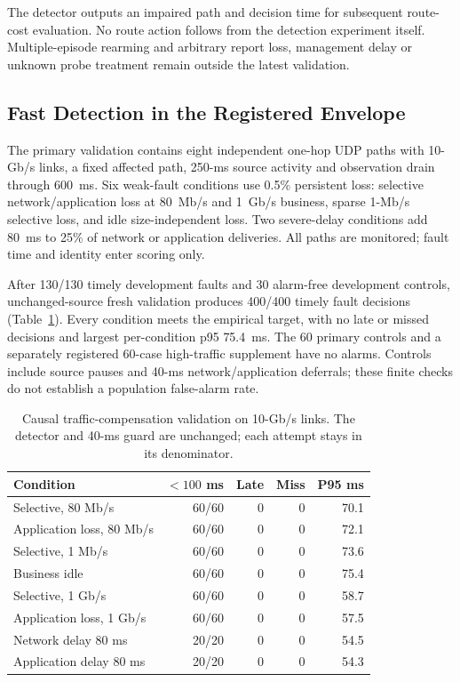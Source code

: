 \documentclass[sigconf]{acmart}
\begin{document}
The detector outputs an impaired path and decision time for subsequent
route-cost evaluation. No route action follows from the detection experiment
itself. Multiple-episode rearming and arbitrary report loss, management delay
or unknown probe treatment remain outside the latest validation.

\subsection{Fast Detection in the Registered Envelope}
\label{app:udp-primary-validation}
The primary validation contains eight independent one-hop UDP paths with
10-Gb/s links, a fixed affected path, 250-ms source activity and observation
drain through 600~ms. Six weak-fault conditions use 0.5\% persistent loss:
selective network/application loss at 80~Mb/s and 1~Gb/s business, sparse
1-Mb/s selective loss, and idle size-independent loss. Two severe-delay
conditions add 80~ms to 25\% of network or application deliveries. All paths
are monitored; fault time and identity enter scoring only.

After 130/130 timely development faults and 30 alarm-free development
controls, unchanged-source fresh validation produces 400/400 timely fault
decisions (Table~\ref{tab:adaptive-business-validation}). Every condition
meets the empirical target, with no late or missed decisions and largest
per-condition p95 75.4~ms. The 60 primary controls and a separately registered
60-case high-traffic supplement have no alarms. Controls include source
pauses and 40-ms network/application deferrals; these finite checks do not
establish a population false-alarm rate.

\begin{table}[t]
\caption{Causal traffic-compensation validation on 10-Gb/s links.
The detector and 40-ms guard are unchanged; each attempt stays in its denominator.}
\label{tab:adaptive-business-validation}
\centering
\small
\setlength{\tabcolsep}{3pt}
\begin{tabular}{@{}lrrrr@{}}
\toprule
Condition & $<100$ ms & Late & Miss & P95 ms \\
\midrule
Selective, 80 Mb/s & 60/60 & 0 & 0 & 70.1 \\
Application loss, 80 Mb/s & 60/60 & 0 & 0 & 72.1 \\
Selective, 1 Mb/s & 60/60 & 0 & 0 & 73.6 \\
Business idle & 60/60 & 0 & 0 & 75.4 \\
Selective, 1 Gb/s & 60/60 & 0 & 0 & 58.7 \\
Application loss, 1 Gb/s & 60/60 & 0 & 0 & 57.5 \\
Network delay 80 ms & 20/20 & 0 & 0 & 54.5 \\
Application delay 80 ms & 20/20 & 0 & 0 & 54.3 \\
\bottomrule
\end{tabular}
\end{table}
\end{document}
